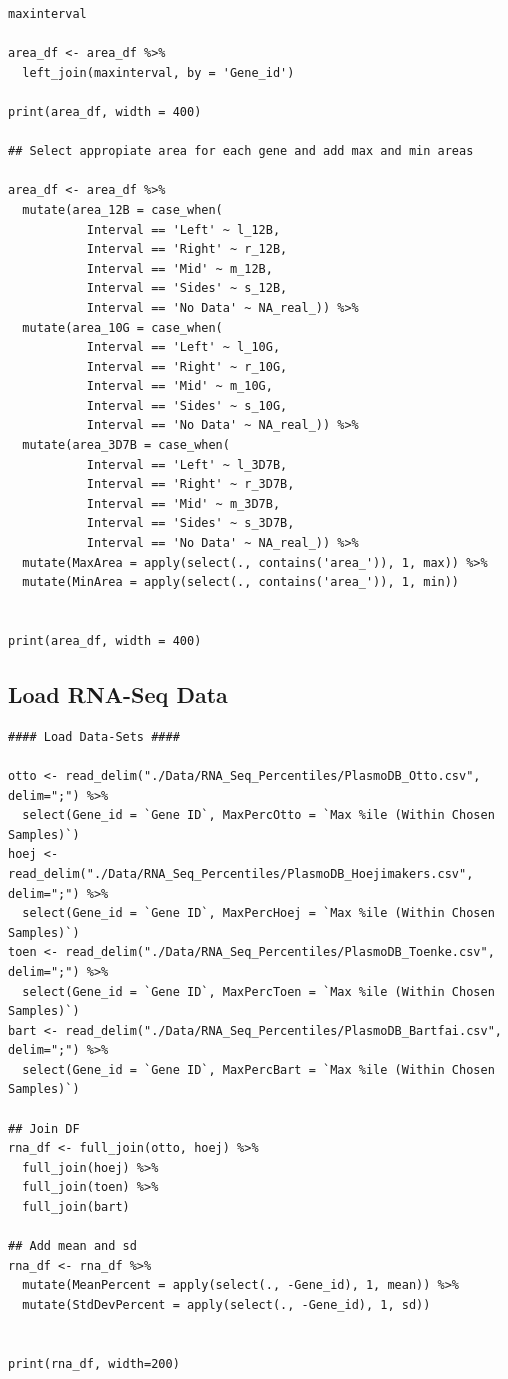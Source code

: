 \documentclass[11pt]{article}
\begin{document}
\begin{verbatim}
maxinterval

area_df <- area_df %>%
  left_join(maxinterval, by = 'Gene_id')

print(area_df, width = 400)

## Select appropiate area for each gene and add max and min areas

area_df <- area_df %>%
  mutate(area_12B = case_when(
           Interval == 'Left' ~ l_12B,
           Interval == 'Right' ~ r_12B,
           Interval == 'Mid' ~ m_12B,
           Interval == 'Sides' ~ s_12B,
           Interval == 'No Data' ~ NA_real_)) %>%
  mutate(area_10G = case_when(
           Interval == 'Left' ~ l_10G,
           Interval == 'Right' ~ r_10G,
           Interval == 'Mid' ~ m_10G,
           Interval == 'Sides' ~ s_10G,
           Interval == 'No Data' ~ NA_real_)) %>%
  mutate(area_3D7B = case_when(
           Interval == 'Left' ~ l_3D7B,
           Interval == 'Right' ~ r_3D7B,
           Interval == 'Mid' ~ m_3D7B,
           Interval == 'Sides' ~ s_3D7B,
           Interval == 'No Data' ~ NA_real_)) %>%
  mutate(MaxArea = apply(select(., contains('area_')), 1, max)) %>%
  mutate(MinArea = apply(select(., contains('area_')), 1, min))


print(area_df, width = 400)
\end{verbatim}
\subsection{Load RNA-Seq Data}
\label{sec:org32b8871}

\begin{verbatim}
#### Load Data-Sets ####

otto <- read_delim("./Data/RNA_Seq_Percentiles/PlasmoDB_Otto.csv", delim=";") %>%
  select(Gene_id = `Gene ID`, MaxPercOtto = `Max %ile (Within Chosen Samples)`)
hoej <- read_delim("./Data/RNA_Seq_Percentiles/PlasmoDB_Hoejimakers.csv", delim=";") %>%
  select(Gene_id = `Gene ID`, MaxPercHoej = `Max %ile (Within Chosen Samples)`)
toen <- read_delim("./Data/RNA_Seq_Percentiles/PlasmoDB_Toenke.csv", delim=";") %>%
  select(Gene_id = `Gene ID`, MaxPercToen = `Max %ile (Within Chosen Samples)`)
bart <- read_delim("./Data/RNA_Seq_Percentiles/PlasmoDB_Bartfai.csv", delim=";") %>%
  select(Gene_id = `Gene ID`, MaxPercBart = `Max %ile (Within Chosen Samples)`)

## Join DF
rna_df <- full_join(otto, hoej) %>%
  full_join(hoej) %>%
  full_join(toen) %>%
  full_join(bart)

## Add mean and sd
rna_df <- rna_df %>%
  mutate(MeanPercent = apply(select(., -Gene_id), 1, mean)) %>%
  mutate(StdDevPercent = apply(select(., -Gene_id), 1, sd))


print(rna_df, width=200)
\end{verbatim}
\end{document}
